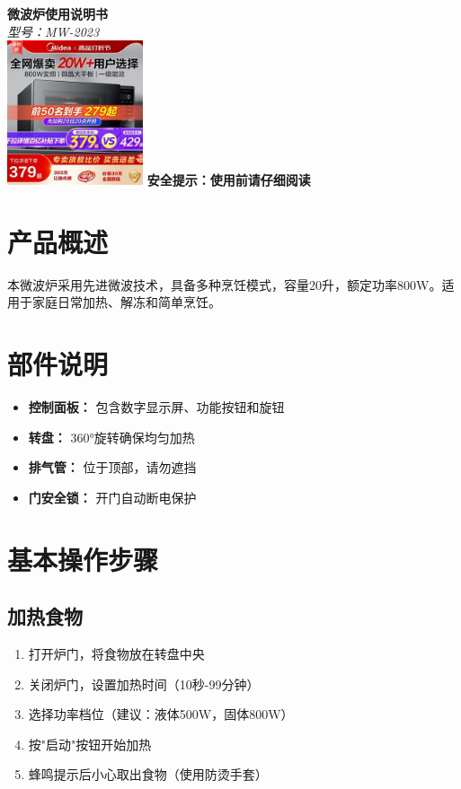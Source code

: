 \documentclass[UTF8]{ctexart}
\begin{document}
\pagestyle{plain}%
\begin{center}
    \Huge\textbf{微波炉使用说明书}\\
    \vspace{0.5cm}
    \Large\textit{型号：MW-2023}\\
    \vspace{1cm}
    \includegraphics[width=0.3\textwidth]{images/microwave.png} %
    \vspace{1cm}
    \Large\textbf{安全提示：使用前请仔细阅读}
\end{center}

\section{产品概述}
本微波炉采用先进微波技术，具备多种烹饪模式，容量20升，额定功率800W。适用于家庭日常加热、解冻和简单烹饪。

\section{部件说明}
\begin{itemize}[leftmargin=*]
    \item \textbf{控制面板：} 包含数字显示屏、功能按钮和旋钮
    \item \textbf{转盘：} 360°旋转确保均匀加热
    \item \textbf{排气管：} 位于顶部，请勿遮挡
    \item \textbf{门安全锁：} 开门自动断电保护
\end{itemize}

\section{基本操作步骤}
\subsection{加热食物}
\begin{enumerate}
    \item 打开炉门，将食物放在转盘中央
    \item 关闭炉门，设置加热时间（10秒-99分钟）
    \item 选择功率档位（建议：液体500W，固体800W）
    \item 按"启动"按钮开始加热
    \item 蜂鸣提示后小心取出食物（使用防烫手套）
\end{enumerate}
\end{document}

